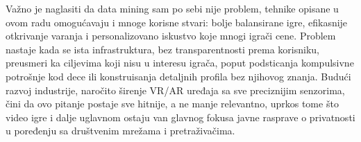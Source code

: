 \documentclass[12pt]{article}
\begin{document}
Važno je naglasiti da data mining sam po sebi nije problem, tehnike opisane u ovom radu omogućavaju i mnoge korisne stvari: bolje balansirane igre, efikasnije otkrivanje varanja i personalizovano iskustvo koje mnogi igrači cene. Problem nastaje kada se ista infrastruktura, bez transparentnosti prema korisniku, preusmeri ka ciljevima koji nisu u interesu igrača, poput podsticanja kompulsivne potrošnje kod dece ili konstruisanja detaljnih profila bez njihovog znanja. Budući razvoj industrije, naročito širenje VR/AR uređaja sa sve preciznijim senzorima, čini da ovo pitanje postaje sve hitnije, a ne manje relevantno, uprkos tome što video igre i dalje uglavnom ostaju van glavnog fokusa javne rasprave o privatnosti u poređenju sa društvenim mrežama i pretraživačima.

\renewcommand{\refname}{Literatura}
\end{document}
